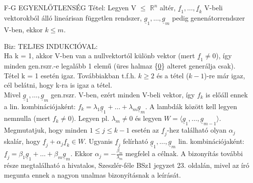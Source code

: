 \documentclass[]{article}
\newcommand{\Rn}[1]{$\mathbb{R}^{#1}$}
\newcommand{\Und}[1]{\underline{#1}}
\begin{document}
\begin{framed}
F-G EGYENLŐTLENSÉG Tétel: Legyen V $\leq$ \Rn{n} altér, $\Und{f}_1,\ldots,\Und{f}_k$ V-beli vektorokból álló lineárisan független rendszer, $\Und{g}_1,\ldots,\Und{g}_m$ pedig genenátorrendszer V-ben, ekkor $k \leq m$.
\end{framed}
\begin{leftbar}
Biz: TELJES INDUKCIÓVAL:\\
Ha k = 1, akkor V-ben van a nullvektortól különb vektor (mert $\Und{f}_{1} \neq 0$), így minden gen.rszr.-e legalább 1 elemű (üres halmaz \{\Und{0}\} alteret generálja csak). Tétel k = 1 esetén igaz. Továbbiakban t.f.h. $k \geq 2$ és a tétel ($k - 1$)-re már igaz, cél belátni, hogy k-ra is igaz a tétel.\\
Mivel $\Und{g}_1,\ldots,\Und{g}_m$ gen.rszr. V-ben, ezért minden V-beli vektor, így $f_k$ is előáll ennek a lin. kombinációjaként: $f_k = \lambda_1\Und{g}_1 + \ldots + \lambda_m\Und{g}_m$. A lambdák között kell legyen nemnulla (mert $f_k \neq 0$). Legyen pl. $\lambda_m \neq 0$ és legyen $W = \langle \Und{g}_1, \ldots, \Und{g}_{m-1} \rangle$. Megmutatjuk, hogy minden $1 \leq j \leq k-1$ esetén az $\Und{f}_j$-hez található olyan $\alpha_j$ skalár, hogy $\Und{f}_j + \alpha_j\Und{f}_k \in W$. Ugyanis $\Und{f}_j$ felírható $\Und{g}_1,\ldots,\Und{g}_m$ lin. kombinációjaként: $\Und{f}_j = \beta_1\Und{g}_1+\ldots+\beta_m\Und{g}_m$. Ekkor $\alpha_j = -\frac{\beta_m}{\lambda_m}$ megfelel a célnak. A bizonyítás további része megtalálható a hivatalos, Szeszlér-féle BSz1 jegyzet 23. oldalán, mivel az író megunta ennek a nagyon unalmas bizonyításnak a leírását.
\end{leftbar}
\end{document}
